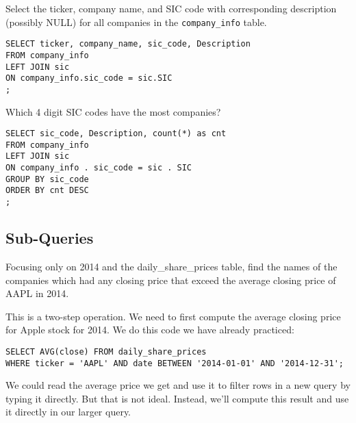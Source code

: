 \documentclass[10pt]{exam}
\begin{document}
\begin{questions}
\question Select the ticker, company name, and SIC code with corresponding
    description (possibly NULL) for
    all companies in the \texttt{company\_info} table. 

\begin{solution}
\begin{lstlisting}
SELECT ticker, company_name, sic_code, Description
FROM company_info
LEFT JOIN sic
ON company_info.sic_code = sic.SIC
;
\end{lstlisting}
\end{solution}

\question Which 4 digit SIC codes have the most companies?

\begin{solution}
\begin{lstlisting}
SELECT sic_code, Description, count(*) as cnt
FROM company_info
LEFT JOIN sic
ON company_info . sic_code = sic . SIC
GROUP BY sic_code
ORDER BY cnt DESC
;
\end{lstlisting}
\end{solution}


\subsection*{Sub-Queries}

\question
Focusing only on 2014 and the daily_share_prices table,
find the names of the companies which had any closing price that exceed the average closing price of AAPL in 2014.


\begin{solution}
This is a two-step operation.
We need to first compute the average closing price for Apple stock
for 2014.
We do this code we have already practiced:
\begin{lstlisting}
SELECT AVG(close) FROM daily_share_prices
WHERE ticker = 'AAPL' AND date BETWEEN '2014-01-01' AND '2014-12-31';
\end{lstlisting}

We could read the average price we get and use it to
filter rows in a new query by typing it directly.
But that is not ideal. Instead, we'll compute this
result and use it directly in our larger query.


\end{solution}
\end{questions}
\end{document}
